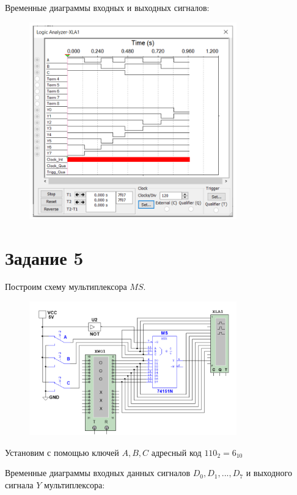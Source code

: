 \documentclass[bachelor, och, labwork]{shiza}
\begin{document}
Временные диаграммы входных и выходных сигналов:

\begin{figure}[H]
    \centering
    \includegraphics[width=0.8\textwidth]{pic2/4.png}
    \caption{}
\end{figure}

\section{Задание 5}
Построим схему мультиплексора $MS$.

\begin{figure}[H]
    \centering
    \includegraphics[width=0.8\textwidth]{pic2/5.png}
    \caption{}
\end{figure}

Установим с помощью ключей $A,B,C$ адресный код $110_2 = 6_10$

Временные диаграммы входных данных сигналов $D_0,D_1,...,D_7$ и выходного
сигнала $Y$ мультиплексора:
\end{document}
